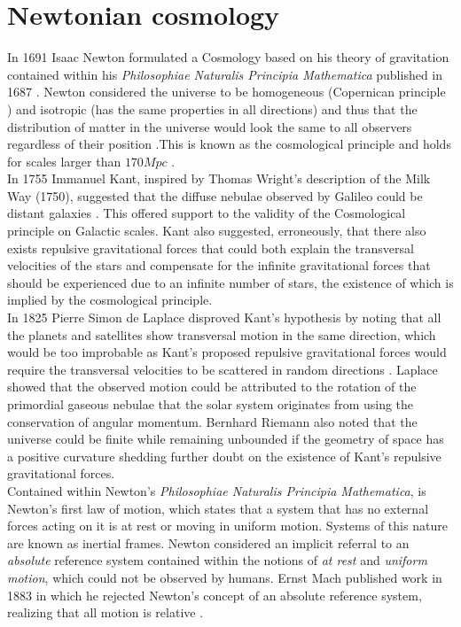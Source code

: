 \documentclass[a4paper, 11pt]{FSKH_623_Report}
\numberwithin{equation}{section}
\begin{document}
\section{Newtonian cosmology}
In 1691 Isaac Newton formulated a Cosmology based on his theory of gravitation contained within his \textit{Philosophiae Naturalis Principia Mathematica} published in 1687 \citep{ITC}.
Newton considered the universe to be homogeneous (Copernican principle \citep{calcagni2017classical}) and isotropic (has the same properties in all directions) and thus that the distribution of matter in the universe would look the same to all observers regardless of their position \citep{ITC}.This is known as the cosmological principle and holds for scales larger than $170Mpc$ \citep{ITC}.\\
In 1755 Immanuel Kant, inspired by Thomas Wright's description of the Milk Way (1750), suggested that the diffuse nebulae observed by Galileo could be distant galaxies \citep{ITC}. This offered support to the validity of the Cosmological principle on Galactic scales. Kant also suggested, erroneously, that there also exists repulsive gravitational forces that could both explain the transversal velocities of the stars and compensate for the infinite gravitational forces that should be experienced due to an infinite number of stars, the existence of which is implied by the cosmological principle. \\
In 1825 Pierre Simon de Laplace disproved Kant's hypothesis by noting that all the planets and satellites show transversal motion in the same direction, which would be too improbable as Kant's proposed repulsive gravitational forces would require the transversal velocities to be scattered in random directions \citep{ITC}. Laplace showed that the observed motion could be attributed to the rotation of the primordial gaseous nebulae that the solar system originates from using the conservation of angular momentum. Bernhard Riemann also noted that the universe could be finite while remaining unbounded if the geometry of space has a positive curvature shedding further doubt on the existence of Kant's repulsive gravitational forces.\\
Contained within Newton's \textit{Philosophiae Naturalis Principia Mathematica}, is Newton's first law of motion, which states that a system that has no external forces acting on it is at rest or moving in uniform motion. Systems of this nature are known as inertial frames. Newton considered an implicit referral to an \textit{absolute} reference system contained within the notions of \textit{at rest} and \textit{uniform motion}, which could not be observed by humans. Ernst Mach published work in 1883 in which he rejected Newton's concept of an absolute reference system, realizing that all motion is relative \citep{ITC}. \\ 
\end{document}
